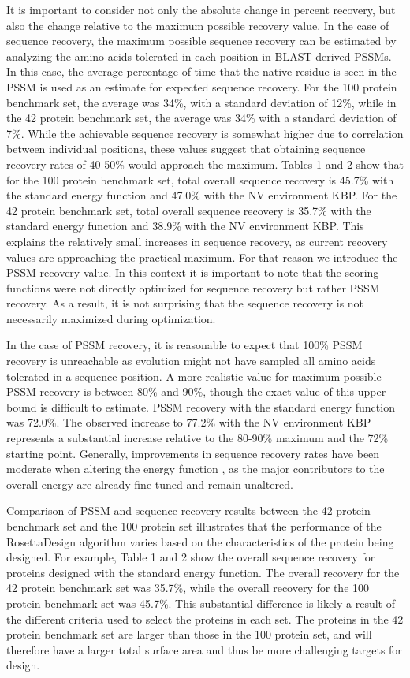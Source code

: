 It is important to consider not only the absolute change in percent recovery, but also the change relative to the maximum possible recovery value.
In the case of sequence recovery, the maximum possible sequence recovery can be estimated by analyzing the amino acids tolerated in each position in BLAST derived PSSMs.
In this case, the average percentage of time that the native residue is seen in the PSSM is used as an estimate for expected sequence recovery.
For the 100 protein benchmark set, the average was 34\%, with a standard deviation of 12\%, while in the 42 protein benchmark set, the average was 34\% with a standard deviation of 7\%.
While the achievable sequence recovery is somewhat higher due to correlation between individual positions, these values suggest that obtaining sequence recovery rates of 40-50\% would approach the maximum.
Tables 1 and 2 show that for the 100 protein benchmark set, total overall sequence recovery is 45.7\% with the standard energy function and 47.0\% with the NV environment KBP.
For the 42 protein benchmark set, total overall sequence recovery is 35.7\% with the standard energy function and 38.9\% with the NV environment KBP.
This explains the relatively small increases in sequence recovery, as current recovery values are approaching the practical maximum.
For that reason we introduce the PSSM recovery value.
In this context it is important to note that the scoring functions were not directly optimized for sequence recovery but rather PSSM recovery.
As a result, it is not surprising that the sequence recovery is not necessarily maximized during optimization. 

In the case of PSSM recovery, it is reasonable to expect that 100\% PSSM recovery is unreachable as evolution might not have sampled all amino acids tolerated in a sequence position.
A more realistic value for maximum possible PSSM recovery is between 80\% and 90\%, though the exact value of this upper bound is difficult to estimate. PSSM recovery with the standard energy function was 72.0\%.
The observed increase to 77.2\% with the NV environment KBP represents a substantial increase relative to the 80-90\% maximum and the 72\% starting point.
Generally, improvements in sequence recovery rates have been moderate when altering the energy function \citep{Kortemme:2003td}, as the major contributors to the overall energy are already fine-tuned and remain unaltered. 

Comparison of PSSM and sequence recovery results between the 42 protein benchmark set and the 100 protein set illustrates that the performance of the RosettaDesign algorithm varies based on the characteristics of the protein being designed.
For example, Table 1 and 2 show the overall sequence recovery for proteins designed with the standard energy function.
The overall recovery for the 42 protein benchmark set was 35.7\%, while the overall recovery for the 100 protein benchmark set was 45.7\%.
This substantial difference is likely a result of the different criteria used to select the proteins in each set.
The proteins in the 42 protein benchmark set are larger than those in the 100 protein set, and will therefore have a larger total surface area and thus be more challenging targets for design.

